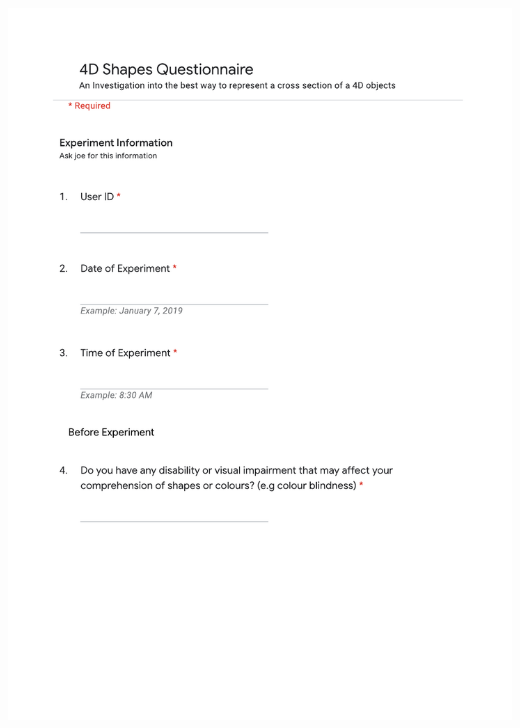 \documentclass{l4proj}
\begin{document}
\begin{appendices}
\hspace*{-1.5cm}
\includegraphics[page=1, height=\textheight]{images/4d_shapes_questionnaire.pdf}


\end{appendices}






\end{document}
